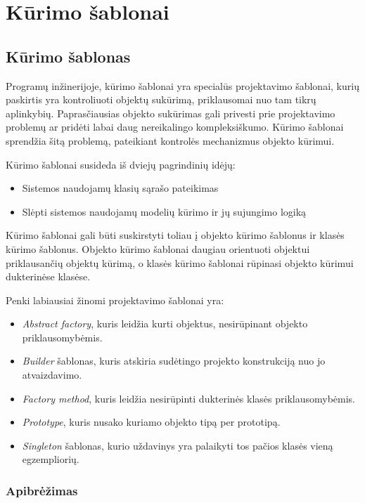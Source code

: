 \documentclass[10pt]{IEEEtran}
\begin{document}
	\section{Kūrimo šablonai}

		\subsection{Kūrimo šablonas}

			Programų inžinerijoje, kūrimo šablonai yra specialūs projektavimo šablonai, kurių paskirtis yra kontroliuoti objektų sukūrimą, priklausomai nuo tam tikrų aplinkybių. Paprasčiausias objekto sukūrimas gali privesti prie projektavimo problemų ar pridėti labai daug nereikalingo kompleksiškumo. Kūrimo šablonai sprendžia šitą problemą, pateikiant kontrolės mechanizmus objekto kūrimui.

			Kūrimo šablonai susideda iš dviejų pagrindinių idėjų:
			\begin{itemize}
				\item Sistemos naudojamų klasių sąrašo pateikimas
				\item Slėpti sistemos naudojamų modelių kūrimo ir jų sujungimo logiką 
			\end{itemize}

			Kūrimo šablonai gali būti suskirstyti toliau į objekto kūrimo šablonus ir klasės kūrimo šablonus. Objekto kūrimo šablonai daugiau orientuoti objektui priklausančių objektų kūrimą, o klasės kūrimo šablonai rūpinasi objekto kūrimui dukterinėse klasėse.

			Penki labiausiai žinomi projektavimo šablonai yra:

			\begin{itemize}
				\item \textit{Abstract factory}, kuris leidžia kurti objektus, nesirūpinant objekto priklausomybėmis.
				\item \textit{Builder} šablonas, kuris atskiria sudėtingo projekto konstrukciją nuo jo atvaizdavimo.
				\item \textit{Factory method}, kuris leidžia nesirūpinti dukterinės klasės priklausomybėmis.
				\item \textit{Prototype}, kuris nusako kuriamo objekto tipą per prototipą.
				\item \textit{Singleton} šablonas, kurio uždavinys yra palaikyti tos pačios klasės vieną egzempliorių.
			\end{itemize}


			\subsubsection{Apibrėžimas}
\end{document}
